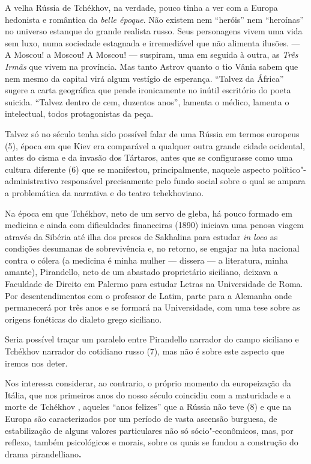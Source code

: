 A velha Rússia de Tchékhov, na verdade, pouco tinha a ver com a Europa
hedonista e romântica da \emph{belle époque}. Não existem nem ``heróis''
nem ``heroínas'' no universo estanque do grande realista russo. Seus
personagens vivem uma vida sem luxo, numa sociedade estagnada e
irremediável que não alimenta ilusões. --- A Moscou! a Moscou! A Moscou!
--- suspiram, uma em seguida à outra, as \emph{Três Irmãs} que vivem na
província. Mas tanto Astrov quanto o tio Vânia sabem que nem mesmo da
capital virá algum vestígio de esperança. ``Talvez da África'' sugere a
carta geográfica que pende ironicamente no inútil escritório do poeta
suicida. ``Talvez dentro de cem, duzentos anos'', lamenta o médico,
lamenta o intelectual, todos protagonistas da peça.

Talvez só no século  tenha sido possível falar de uma Rússia em termos
europeus (5), época em que Kiev era comparável a qualquer outra grande
cidade ocidental, antes do cisma e da invasão dos Tártaros, antes que se
configurasse como uma cultura diferente (6) que se manifestou,
principalmente, naquele aspecto político"-administrativo responsável
precisamente pelo fundo social sobre o qual se ampara a problemática da
narrativa e do teatro tchekhoviano.

Na época em que Tchékhov, neto de um servo de gleba, há pouco formado em
medicina e ainda com dificuldades financeiras (1890) iniciava uma penosa
viagem através da Sibéria até ilha dos presos de Sakhalina para estudar
\emph{in loco} as condições desumanas de sobrevivência e, no retorno, se
engajar na luta nacional contra o cólera (a medicina é minha mulher ---
dissera --- a literatura, minha amante), Pirandello, neto de um abastado
proprietário siciliano, deixava a Faculdade de Direito em Palermo para
estudar Letras na Universidade de Roma. Por desentendimentos com o
professor de Latim, parte para a Alemanha onde permanecerá por três anos
e se formará na Universidade, com uma tese sobre as origens fonéticas do
dialeto grego siciliano.

Seria possível traçar um paralelo entre Pirandello narrador do campo
siciliano e Tchékhov narrador do cotidiano russo (7), mas não é sobre
este aspecto que iremos nos deter.

Nos interessa considerar, ao contrario, o próprio momento da
europeização da Itália, que nos primeiros anos do nosso século coincidiu
com a maturidade e a morte de Tchékhov , aqueles ``anos felizes'' que a
Rússia não teve (8) e que na Europa são caracterizados por um período de
vasta ascensão burguesa, de estabilização de alguns valores particulares
não só sócio"-econômicos, mas, por reflexo, também psicológicos e morais,
sobre os quais se fundou a construção do drama pirandelliano\textbf{. }

